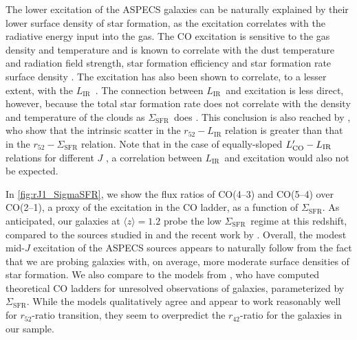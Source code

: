 \documentclass[twocolumn]{aastex62}
\newcommand{\LIR}{\ensuremath{L_{\mathrm{IR}}}}
\newcommand{\SigmaSFR}{\ensuremath{\Sigma_{\mathrm{SFR}}}}
\newcommand{\avg}[1]{\ensuremath{\langle #1 \rangle}}
\begin{document}
The lower excitation of the ASPECS galaxies can be naturally explained by their
lower surface density of star formation, as the excitation correlates with the
radiative energy input into the gas.  The CO excitation is sensitive to the gas
density and temperature and is known to correlate with the dust temperature
\citep{Rosenberg2015} and radiation field strength, star formation efficiency
and star formation rate surface density \citep{Daddi2015, Valentino2020b}.  The
excitation has also been shown to correlate, to a lesser extent, with the \LIR\
\citep[e.g.,][]{Rosenberg2015}.  The connection between \LIR\ and excitation is
less direct, however, because the total star formation rate does not correlate
with the density and temperature of the clouds as \SigmaSFR\ does
\citep[cf.][]{Narayanan2014}.  This conclusion is also reached by
\cite{Valentino2020b}, who show that the intrinsic scatter in the $r_{52}-\LIR$
relation is greater than that in the $r_{52}-\SigmaSFR$ relation.  Note that in
the case of equally-sloped $L'_{\rm CO}-\LIR$ relations for different $J$
\citep[for example, the linear relations found by ][]{Liu2015}, a correlation
between \LIR\ and excitation would also not be expected.

In \autoref{fig:rJ1_SigmaSFR}, we show the flux ratios of CO(4--3) and CO(5--4)
over CO(2--1), a proxy of the excitation in the CO ladder, as a function of
\SigmaSFR.  As anticipated, our galaxies at $\avg{z} = 1.2$ probe the low
\SigmaSFR\ regime at this redshift, compared to the sources studied in
\cite{Daddi2015} and the recent work by \cite{Valentino2020b}.  Overall, the
modest mid-$J$ excitation of the ASPECS sources appears to naturally follow
from the fact that we are probing galaxies with, on average, more moderate
surface densities of star formation.  We also compare to the models from
\cite{Narayanan2014}, who have computed theoretical CO ladders for unresolved
observations of galaxies, parameterized by \SigmaSFR.  While the models
qualitatively agree and appear to work reasonably well for $r_{52}$-ratio
transition, they seem to overpredict the $r_{42}$-ratio for the galaxies in our
sample.
\end{document}
